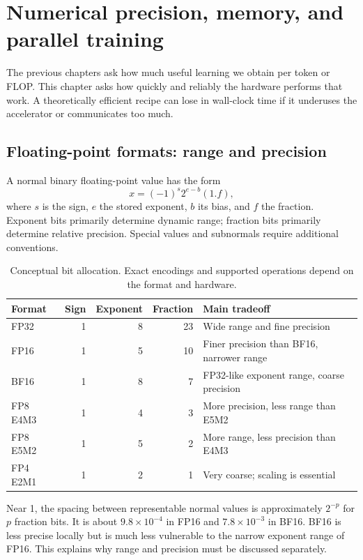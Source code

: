 \chapter{Numerical precision, memory, and parallel training}
\label{ch:efficiency}

The previous chapters ask how much useful learning we obtain per token or FLOP. This chapter asks how quickly and reliably the hardware performs that work. A theoretically efficient recipe can lose in wall-clock time if it underuses the accelerator or communicates too much.

\section{Floating-point formats: range and precision}
A normal binary floating-point value has the form
\[
x=(-1)^s 2^{e-b}(1.f),
\]
where $s$ is the sign, $e$ the stored exponent, $b$ its bias, and $f$ the fraction. Exponent bits primarily determine dynamic range; fraction bits primarily determine relative precision. Special values and subnormals require additional conventions.


\begin{table}[htbp]\centering\small
\begin{tabular}{lrrrl}
\toprule
Format&Sign&Exponent&Fraction&Main tradeoff\\
\midrule
FP32&1&8&23&Wide range and fine precision\\
FP16&1&5&10&Finer precision than BF16, narrower range\\
BF16&1&8&7&FP32-like exponent range, coarse precision\\
FP8 E4M3&1&4&3&More precision, less range than E5M2\\
FP8 E5M2&1&5&2&More range, less precision than E4M3\\
FP4 E2M1&1&2&1&Very coarse; scaling is essential\\
\bottomrule
\end{tabular}
\caption{Conceptual bit allocation. Exact encodings and supported operations depend on the format and hardware.}
\end{table}

Near 1, the spacing between representable normal values is approximately $2^{-p}$ for $p$ fraction bits. It is about $9.8\times10^{-4}$ in FP16 and $7.8\times10^{-3}$ in BF16. BF16 is less precise locally but is much less vulnerable to the narrow exponent range of FP16. This explains why range and precision must be discussed separately.

